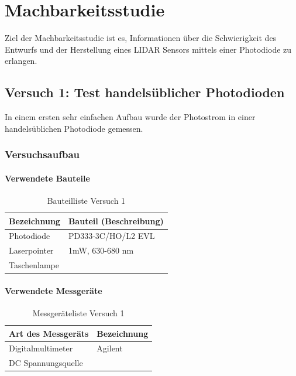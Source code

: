 \chapter{Machbarkeitsstudie}\label{chap:machbarkeitsstudie}
Ziel der Machbarkeitsstudie ist es, Informationen über die Schwierigkeit des Entwurfs und der Herstellung eines \ac{LIDAR} Sensors mittels einer Photodiode zu erlangen. 

\section{Versuch 1: Test handelsüblicher Photodioden}
In einem ersten sehr einfachen Aufbau wurde der Photostrom in einer handelsüblichen Photodiode gemessen.
\subsection{Versuchsaufbau}
\subsubsection{Verwendete Bauteile}

\begin{table}[H]
	\centering
	\caption{Bauteilliste Versuch 1}
	\begin{tabular}{|l|l|}
		\hline
		\textbf{Bezeichnung} & \textbf{Bauteil (Beschreibung)}
		\\\hline
		Photodiode & PD333-3C/HO/L2 EVL
		\\\hline
		Laserpointer & 1mW, 630-680 nm
		\\\hline
		Taschenlampe & 
		\\\hline
	\end{tabular}
\end{table}

\subsubsection{Verwendete Messgeräte}
\begin{table}[H]
	\centering
	\caption{Messgeräteliste Versuch 1}
	\begin{tabular}{|l|l|}
		\hline
		\textbf{Art des Messgeräts} & \textbf{Bezeichnung}
		\\\hline
		Digitalmultimeter & Agilent
		\\\hline
		DC Spannungsquelle &
		\\\hline
	\end{tabular}
\end{table}
